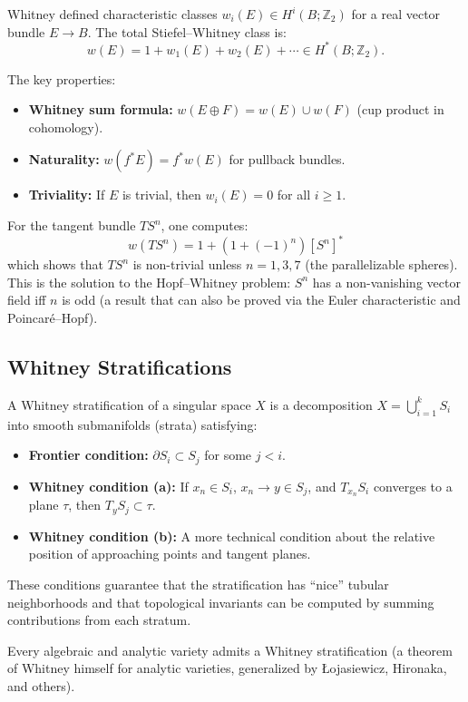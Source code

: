 Whitney defined characteristic classes $w_i(E) \in H^i(B; \mathbb{Z}_2)$ for a real vector bundle $E \to B$. The total Stiefel--Whitney class is:
\[
w(E) = 1 + w_1(E) + w_2(E) + \cdots \in H^*(B; \mathbb{Z}_2).
\]

The key properties:
\begin{itemize}
    \item \textbf{Whitney sum formula:} $w(E \oplus F) = w(E) \cup w(F)$ (cup product in cohomology).
    \item \textbf{Naturality:} $w(f^*E) = f^*w(E)$ for pullback bundles.
    \item \textbf{Triviality:} If $E$ is trivial, then $w_i(E) = 0$ for all $i \geq 1$.
\end{itemize}

For the tangent bundle $TS^n$, one computes:
\[
w(TS^n) = 1 + (1 + (-1)^n) [S^n]^*
\]
which shows that $TS^n$ is non-trivial unless $n = 1, 3, 7$ (the parallelizable spheres). This is the solution to the Hopf--Whitney problem: $S^n$ has a non-vanishing vector field iff $n$ is odd (a result that can also be proved via the Euler characteristic and Poincar{\'e}--Hopf).

\subsection{Whitney Stratifications}

A Whitney stratification of a singular space $X$ is a decomposition $X = \bigcup_{i=1}^k S_i$ into smooth submanifolds (strata) satisfying:
\begin{itemize}
    \item \textbf{Frontier condition:} $\partial S_i \subset S_j$ for some $j < i$.
    \item \textbf{Whitney condition (a):} If $x_n \in S_i$, $x_n \to y \in S_j$, and $T_{x_n}S_i$ converges to a plane $\tau$, then $T_y S_j \subset \tau$.
    \item \textbf{Whitney condition (b):} A more technical condition about the relative position of approaching points and tangent planes.
\end{itemize}

These conditions guarantee that the stratification has ``nice'' tubular neighborhoods and that topological invariants can be computed by summing contributions from each stratum.

Every algebraic and analytic variety admits a Whitney stratification (a theorem of Whitney himself for analytic varieties, generalized by \L ojasiewicz, Hironaka, and others).


